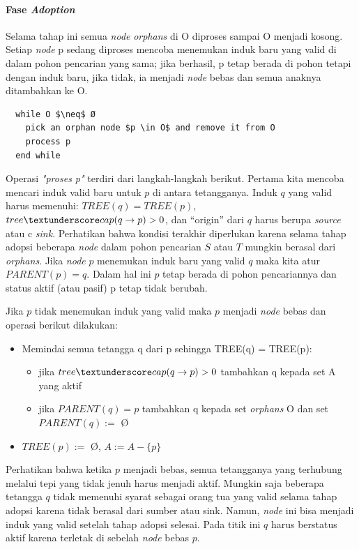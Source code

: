 \paragraph{Fase \emph{Adoption}} \label{fase_adoption}

Selama tahap ini semua \emph{node} \emph{orphans} di O diproses sampai O menjadi kosong. 
Setiap \emph{node} p sedang diproses mencoba menemukan induk baru yang valid di dalam pohon 
pencarian yang sama; jika berhasil, p tetap berada di pohon tetapi dengan induk baru, 
jika tidak, ia menjadi \emph{node} bebas dan semua anaknya ditambahkan ke O.

\begin{lstlisting}
  while O $\neq$ Ø  
    pick an orphan node $p \in O$ and remove it from O
    process p
  end while
\end{lstlisting}

Operasi \emph{"proses p"} terdiri dari langkah-langkah berikut. Pertama kita mencoba mencari 
induk valid baru untuk \(p\) di antara tetangganya. Induk \(q\) yang valid harus memenuhi: 
\(TREE(q) = TREE(p)\), \(tree\textunderscore cap(q \rightarrow p) > 0\), dan “origin” 
dari \(q\) harus berupa \emph{source} atau c \emph{sink}. Perhatikan bahwa kondisi terakhir 
diperlukan karena selama tahap adopsi beberapa \emph{node} dalam pohon pencarian \(S\) atau \(T\) 
mungkin berasal dari \emph{orphans}. Jika \emph{node} \(p\) menemukan induk baru yang valid 
\(q\) maka kita atur \(PARENT(p) = q\). Dalam hal ini \(p\) tetap berada di pohon pencariannya 
dan status aktif (atau pasif) p tetap tidak berubah. 

Jika \(p\) tidak menemukan induk yang valid maka \(p\) menjadi \emph{node} bebas dan operasi 
berikut dilakukan:

\begin{itemize}
  \item Memindai semua tetangga q dari p sehingga TREE(q) = TREE(p):  
  \begin{itemize}
    \item jika \(tree\textunderscore cap(q \rightarrow p) > 0\) tambahkan q kepada set A yang aktif
    \item jika \(PARENT(q) = p\) tambahkan q kepada set \emph{orphans} O dan set \(PARENT(q) :=\) Ø
  \end{itemize}
  \item \(TREE(p) :=\) Ø, \(A := A - \{p\}\)
\end{itemize}

Perhatikan bahwa ketika \(p\) menjadi bebas, semua tetangganya yang terhubung melalui 
tepi yang tidak jenuh harus menjadi aktif. Mungkin saja beberapa tetangga \(q\) tidak 
memenuhi syarat sebagai orang tua yang valid selama tahap adopsi karena tidak berasal 
dari sumber atau sink. Namun, \emph{node} ini bisa menjadi induk yang valid setelah 
tahap adopsi selesai. Pada titik ini \(q\) harus berstatus aktif karena terletak di 
sebelah \emph{node} bebas \(p\).


